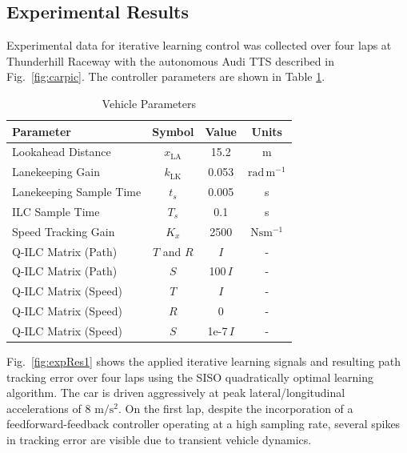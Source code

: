 \documentclass[9pt,shortpaper,twoside,web]{ieeecolor}
\begin{document}
\subsection{Experimental Results}
\label{sec:ch4ExpRes}

Experimental data for iterative learning control was collected over four laps at Thunderhill Raceway with the autonomous Audi TTS
described in Fig.~\ref{fig:carpic}. The controller parameters are shown in Table \ref{tb:ilcprm}. 


\begin{table}[tb]
\begin{center}
\caption{Vehicle Parameters}\label{tb:ilcprm}
\begin{tabular}{lccc}
Parameter & Symbol & Value & Units \\\hline
Lookahead Distance       & $x_\mathrm{LA}$          &  15.2 & $\mathrm{m} $ \\
Lanekeeping Gain         & $k_{\mathrm{LK}}$         & 0.053 & $\mathrm{rad\,m^{-1}}$\\
Lanekeeping Sample Time  & $t_s$                        & 0.005 & s\\
ILC Sample Time          & $T_s$                        & 0.1   & s\\
Speed Tracking Gain                & $K_x$           & 2500 & $\mathrm{Nsm^{-1}}$\\
Q-ILC Matrix (Path)            & $T$ and $R$              &  $I$      & - \\
Q-ILC Matrix  (Path)           & $S$                       & 100\,$I$  & - \\
Q-ILC Matrix (Speed)            & $T$              &  $I$      & - \\
Q-ILC Matrix (Speed)            & $R$              &  $0$      & - \\
Q-ILC Matrix  (Speed)           & $S$                       & 1e-7\,$I$  & - \\\hline
\end{tabular}
\end{center}
\end{table}


Fig.~\ref{fig:expRes1} shows the applied iterative learning signals and resulting path tracking error over four laps using the SISO
quadratically optimal learning algorithm. The car is driven
aggressively at peak lateral/longitudinal accelerations of 8 $\mathrm{m/s^2}$. On the first lap, despite the 
incorporation of a feedforward-feedback controller operating at a high sampling rate, several spikes in tracking error are visible due to transient vehicle dynamics.
\end{document}
